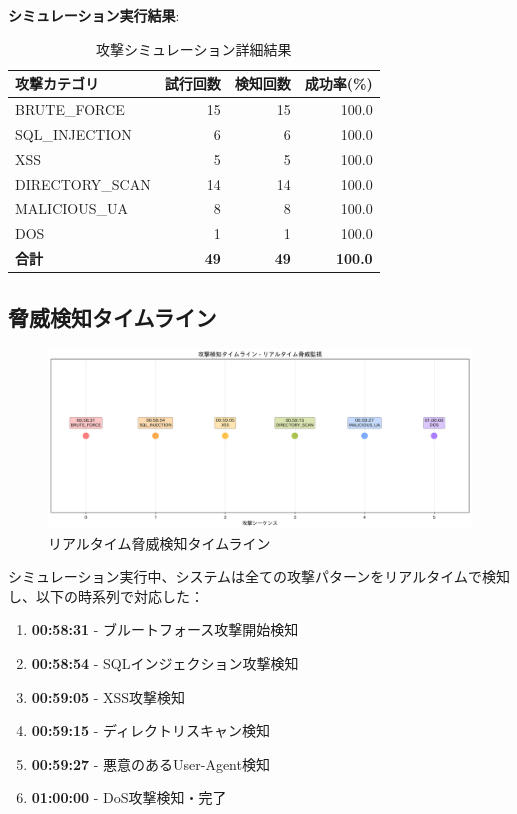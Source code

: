 \documentclass[12pt,a4paper]{article}
\begin{document}
\textbf{シミュレーション実行結果}:
\begin{table}[H]
\centering
\caption{攻撃シミュレーション詳細結果}
\begin{tabular}{@{}lrrr@{}}
\toprule
攻撃カテゴリ & 試行回数 & 検知回数 & 成功率(\%) \\
\midrule
BRUTE\_FORCE & 15 & 15 & 100.0 \\
SQL\_INJECTION & 6 & 6 & 100.0 \\
XSS & 5 & 5 & 100.0 \\
DIRECTORY\_SCAN & 14 & 14 & 100.0 \\
MALICIOUS\_UA & 8 & 8 & 100.0 \\
DOS & 1 & 1 & 100.0 \\
\midrule
\textbf{合計} & \textbf{49} & \textbf{49} & \textbf{100.0} \\
\bottomrule
\end{tabular}
\end{table}

\subsection{脅威検知タイムライン}

\begin{figure}[H]
\centering
\includegraphics[width=1.0\textwidth]{output/threat_detection_timeline.png}
\caption{リアルタイム脅威検知タイムライン}
\label{fig:threat_timeline}
\end{figure}

シミュレーション実行中、システムは全ての攻撃パターンをリアルタイムで検知し、以下の時系列で対応した：

\begin{enumerate}
    \item \textbf{00:58:31} - ブルートフォース攻撃開始検知
    \item \textbf{00:58:54} - SQLインジェクション攻撃検知
    \item \textbf{00:59:05} - XSS攻撃検知
    \item \textbf{00:59:15} - ディレクトリスキャン検知
    \item \textbf{00:59:27} - 悪意のあるUser-Agent検知
    \item \textbf{01:00:00} - DoS攻撃検知・完了
\end{enumerate}
\end{document}

